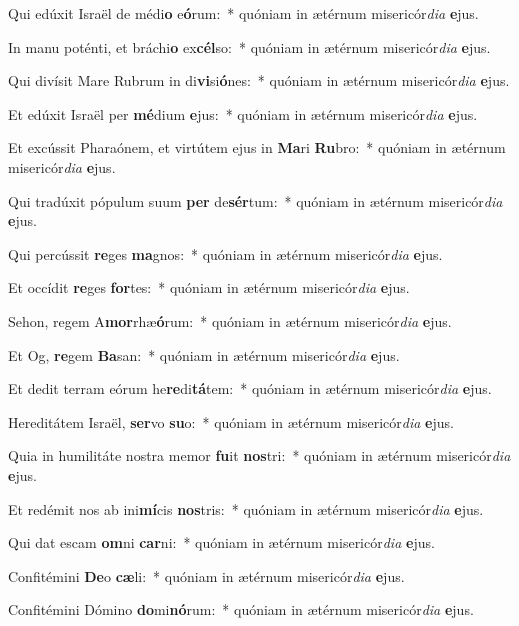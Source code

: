 \item Qui edúxit Israël de médi\textbf{o} e\textbf{ó}rum:~* quóniam in ætérnum misericór\textit{di}\textit{a} \textbf{e}jus.
\item In manu poténti, et bráchi\textbf{o} ex\textbf{cél}so:~* quóniam in ætérnum misericór\textit{di}\textit{a} \textbf{e}jus.
\item Qui divísit Mare Rubrum in di\textbf{vi}si\textbf{ó}nes:~* quóniam in ætérnum misericór\textit{di}\textit{a} \textbf{e}jus.
\item Et edúxit Israël per \textbf{mé}dium \textbf{e}jus:~* quóniam in ætérnum misericór\textit{di}\textit{a} \textbf{e}jus.
\item Et excússit Pharaónem, et virtútem ejus in \textbf{Ma}ri \textbf{Ru}bro:~* quóniam in ætérnum misericór\textit{di}\textit{a} \textbf{e}jus.
\item Qui tradúxit pópulum suum \textbf{per} de\textbf{sér}tum:~* quóniam in ætérnum misericór\textit{di}\textit{a} \textbf{e}jus.
\item Qui percússit \textbf{re}ges \textbf{ma}gnos:~* quóniam in ætérnum misericór\textit{di}\textit{a} \textbf{e}jus.
\item Et occídit \textbf{re}ges \textbf{for}tes:~* quóniam in ætérnum misericór\textit{di}\textit{a} \textbf{e}jus.
\item Sehon, regem A\textbf{mor}rhæ\textbf{ó}rum:~* quóniam in ætérnum misericór\textit{di}\textit{a} \textbf{e}jus.
\item Et Og, \textbf{re}gem \textbf{Ba}san:~* quóniam in ætérnum misericór\textit{di}\textit{a} \textbf{e}jus.
\item Et dedit terram eórum he\textbf{re}di\textbf{tá}tem:~* quóniam in ætérnum misericór\textit{di}\textit{a} \textbf{e}jus.
\item Hereditátem Israël, \textbf{ser}vo \textbf{su}o:~* quóniam in ætérnum misericór\textit{di}\textit{a} \textbf{e}jus.
\item Quia in humilitáte nostra memor \textbf{fu}it \textbf{nos}tri:~* quóniam in ætérnum misericór\textit{di}\textit{a} \textbf{e}jus.
\item Et redémit nos ab ini\textbf{mí}cis \textbf{nos}tris:~* quóniam in ætérnum misericór\textit{di}\textit{a} \textbf{e}jus.
\item Qui dat escam \textbf{om}ni \textbf{car}ni:~* quóniam in ætérnum misericór\textit{di}\textit{a} \textbf{e}jus.
\item Confitémini \textbf{De}o \textbf{cæ}li:~* quóniam in ætérnum misericór\textit{di}\textit{a} \textbf{e}jus.
\item Confitémini Dómino \textbf{do}mi\textbf{nó}rum:~* quóniam in ætérnum misericór\textit{di}\textit{a} \textbf{e}jus.
